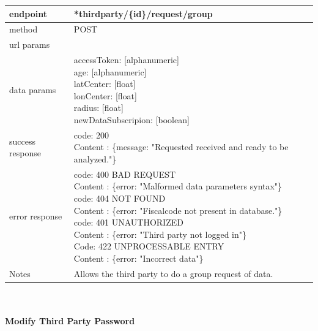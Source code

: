\begin{legal}
\begin{legal}
\begin{itemize}
							\begin{tabularx}{\linewidth}{| l| l }
								\hline
								endpoint & *thirdparty/\{id\}/request/group \\
								\hline
								method & POST \\
								\hline
								url params & \\
								\hline
								data params &
								\parbox{0.7\textwidth}{
									\bigskip
									accessToken: [alphanumeric]\\
									age: [alphanumeric]\\
									latCenter: [float]\\
									lonCenter: [float]\\
									radius: [float]\\
									newDataSubscripion: [boolean]
									\bigskip
								} \\
								\hline
								success response &
								\parbox{0.7\textwidth}{
									\bigskip
									code: 200\\
									Content : \{message: "Requested received and ready to be analyzed."\}
									\bigskip
								} \\
								\hline
								error response &
								\parbox{0.7\textwidth}{
									\bigskip
									code: 400 BAD REQUEST \\
									Content : \{error: "Malformed data parameters syntax"\}\\
									code: 404 NOT FOUND \\
									Content : \{error: "Fiscalcode not present in database."\}\\
									code: 401 UNAUTHORIZED \\
									Content : \{error: "Third party not logged in"\}\\
									Code: 422 UNPROCESSABLE ENTRY \\
									Content : \{error: "Incorrect data"\}
									\bigskip
								} \\
								\hline
								Notes & 
								\parbox{0.7\textwidth}{
									\bigskip Allows the third party to do a group request of data.
								\bigskip}  \\
								\hline
							\end{tabularx}\\\\
					
							\textbf{Modify Third Party Password}\\
				

\end{itemize}
\end{legal}
\end{legal}

